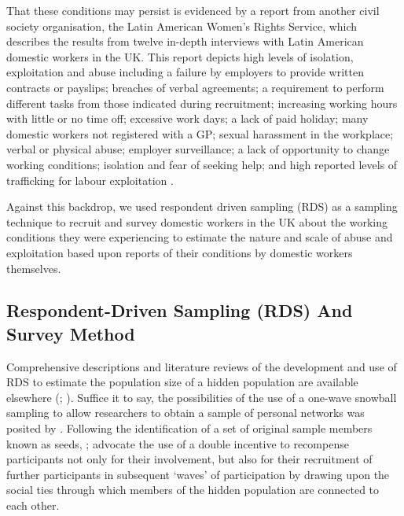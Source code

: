 \documentclass[
  12pt,
  letterpaper,
  DIV=11,
  numbers=noendperiod]{scrartcl}
\theoremstyle{plain}
\theoremstyle{definition}
\begin{document}
That these conditions may persist is evidenced by a report from another
civil society organisation, the Latin American Women's Rights Service,
which describes the results from twelve in-depth interviews with Latin
American domestic workers in the UK. This report depicts high levels of
isolation, exploitation and abuse including a failure by employers to
provide written contracts or payslips; breaches of verbal agreements; a
requirement to perform different tasks from those indicated during
recruitment; increasing working hours with little or no time off;
excessive work days; a lack of paid holiday; many domestic workers not
registered with a GP; sexual harassment in the workplace; verbal or
physical abuse; employer surveillance; a lack of opportunity to change
working conditions; isolation and fear of seeking help; and high
reported levels of trafficking for labour exploitation
\autocite{latin_american_womens_rights_service_behind_2023}.

Against this backdrop, we used respondent driven sampling (RDS) as a
sampling technique to recruit and survey domestic workers in the UK
about the working conditions they were experiencing to estimate the
nature and scale of abuse and exploitation based upon reports of their
conditions by domestic workers themselves.

\subsection{Respondent-Driven Sampling (RDS) And Survey
Method}\label{respondent-driven-sampling-rds-and-survey-method}

Comprehensive descriptions and literature reviews of the development and
use of RDS to estimate the population size of a hidden population are
available elsewhere (\textcite{heckathorn_comment_2011};
\textcite{gile_methods_2018}). Suffice it to say, the possibilities of
the use of a one-wave snowball sampling to allow researchers to obtain a
sample of personal networks was posited by
\textcite{frank_estimating_1994}. Following the identification of a set
of original sample members known as seeds,
\textcite{heckathorn_respondent-driven_1997};
\textcite{heckathorn_respondent-driven_2002} advocate the use of a
double incentive to recompense participants not only for their
involvement, but also for their recruitment of further participants in
subsequent `waves' of participation by drawing upon the social ties
through which members of the hidden population are connected to each
other.
\end{document}
